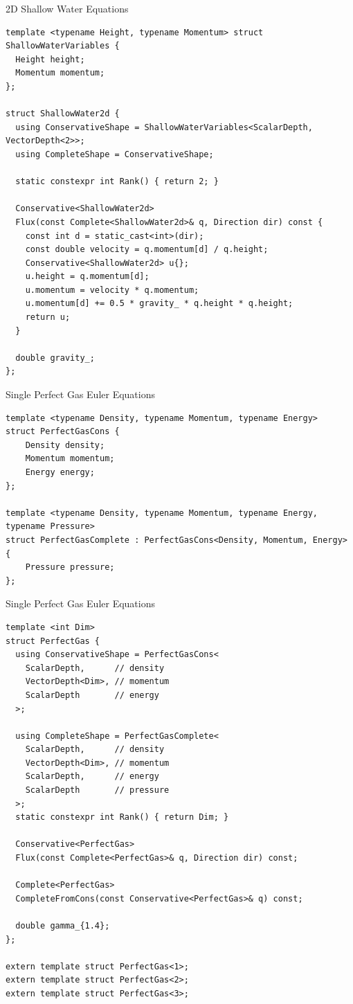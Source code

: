 \documentclass[ucs,9pt]{beamer}
\begin{document}
\begin{frame}[fragile]{2D Shallow Water Equations}

\begin{lstlisting}
template <typename Height, typename Momentum> struct ShallowWaterVariables { 
  Height height;
  Momentum momentum;
};

struct ShallowWater2d {
  using ConservativeShape = ShallowWaterVariables<ScalarDepth, VectorDepth<2>>;
  using CompleteShape = ConservativeShape;

  static constexpr int Rank() { return 2; }

  Conservative<ShallowWater2d>
  Flux(const Complete<ShallowWater2d>& q, Direction dir) const {
    const int d = static_cast<int>(dir);
    const double velocity = q.momentum[d] / q.height;
    Conservative<ShallowWater2d> u{};
    u.height = q.momentum[d];
    u.momentum = velocity * q.momentum;
    u.momentum[d] += 0.5 * gravity_ * q.height * q.height;
    return u;
  }

  double gravity_;
};
\end{lstlisting}
\end{frame}

\begin{frame}[fragile]{Single Perfect Gas Euler Equations}
\begin{lstlisting}
template <typename Density, typename Momentum, typename Energy> 
struct PerfectGasCons { 
	Density density;
	Momentum momentum;
	Energy energy;
};

template <typename Density, typename Momentum, typename Energy, typename Pressure>
struct PerfectGasComplete : PerfectGasCons<Density, Momentum, Energy> {
	Pressure pressure;
};
\end{lstlisting}
\end{frame}

\begin{frame}[fragile]{Single Perfect Gas Euler Equations}
\begin{lstlisting}
template <int Dim>
struct PerfectGas {
  using ConservativeShape = PerfectGasCons<
    ScalarDepth,      // density
    VectorDepth<Dim>, // momentum
    ScalarDepth       // energy
  >;
  
  using CompleteShape = PerfectGasComplete<
    ScalarDepth,      // density
    VectorDepth<Dim>, // momentum
    ScalarDepth,      // energy
    ScalarDepth       // pressure
  >;
  static constexpr int Rank() { return Dim; }

  Conservative<PerfectGas>
  Flux(const Complete<PerfectGas>& q, Direction dir) const;
  
  Complete<PerfectGas> 
  CompleteFromCons(const Conservative<PerfectGas>& q) const;

  double gamma_{1.4};
};

extern template struct PerfectGas<1>;
extern template struct PerfectGas<2>;
extern template struct PerfectGas<3>;
\end{lstlisting}
\end{frame}
\end{document}
